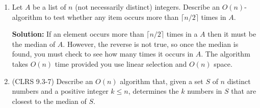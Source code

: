 \documentclass[12pt]{article}
\begin{document}
\begin{enumerate}
\begin{center}
{\begin{minipage}{3.1in}
\begin{itemize}
  {\tt ELSE SELECTION($A_2,n/2-k$)}
  \end{itemize}
  \texttt{END SELECTION}
  \end{minipage}}
  \end{center}

The cost of computing the median using the black-box subroutine is $O(n)$,
and the cost of dividing the array is $O(n)$.  Let $T(n)$ be the cost of
computing the $k-th$ order statistic using the algorithm described above.
Then
%
\begin{eqnarray*}
  T(n) & \leq & cn + T(n/2)   \\
       &   =  & c(n + n/2 + n/4 + n/8 + \dots + T(1))   \\  
       & \leq & 2 cn\\
       &   =  & O(n)
\end{eqnarray*}

\item Let $A$ be a list of $n$ (not necessarily distinct) integers.
  Describe an $O(n)$-algorithm to test whether any item occurs more than
  $\lceil n/2 \rceil$ times in $A$.

  {\bf Solution:} If an element occurs more than $\lceil n/2 \rceil$ times
  in a $A$ then it must be the median of $A$. However, the reverse is not
  true, so once the median is found, you must check to see how many times
  it occurs in $A$. The algorithm takes $O(n)$ time provided you use linear
  selection and $O(n)$ space.

  \begin{center}
  \end{center}

\item (CLRS 9.3-7) Describe an $O(n)$ algorithm that, given a set $S$ of
  $n$ distinct numbers and a positive integer $k \le n$, determines the $k$
  numbers in $S$ that are closest to the median of $S$. 


\end{enumerate}
\end{document}
